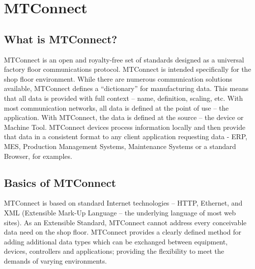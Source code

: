 \section{MTConnect}

\subsection{What is MTConnect?}

MTConnect is an open and royalty-free set of standards designed as a universal factory floor communications protocol. MTConnect is intended specifically for the shop floor environment. While there are numerous communication solutions available, MTConnect defines a “dictionary” for manufacturing data. This means that all data is provided with full context – name, definition, scaling, etc. With most communication networks, all data is defined at the point of use – the application. With MTConnect, the data is defined at the source – the device or Machine Tool. MTConnect devices process information locally and then provide that data in a consistent format to any client application requesting data - ERP, MES, Production Management Systems, Maintenance Systems or a standard Browser, for examples.

\subsection{Basics of MTConnect}

MTConnect is based on standard Internet technologies – HTTP, Ethernet, and XML (Extensible Mark-Up Language – the underlying language of most web sites).
As an Extensible Standard, MTConnect cannot address every conceivable data need on the shop floor. MTConnect provides a clearly defined method for adding additional data types which can be exchanged between equipment, devices, controllers and applications; providing the flexibility to meet the demands of varying environments. 

